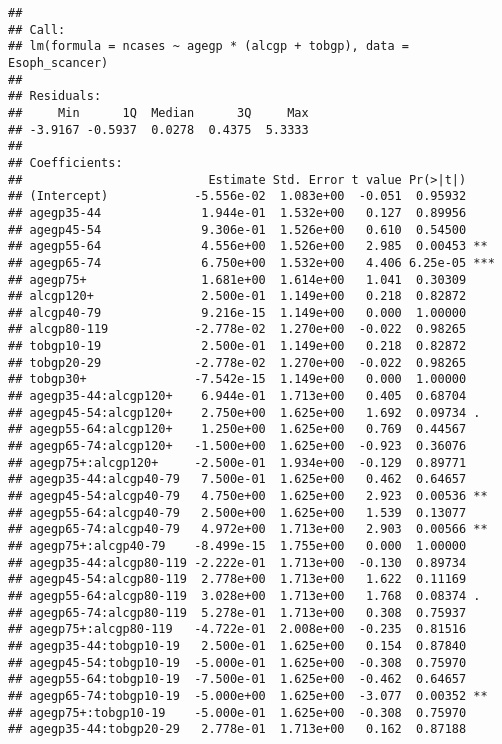 \documentclass[
]{article}
\begin{document}
\begin{verbatim}
## 
## Call:
## lm(formula = ncases ~ agegp * (alcgp + tobgp), data = Esoph_scancer)
## 
## Residuals:
##     Min      1Q  Median      3Q     Max 
## -3.9167 -0.5937  0.0278  0.4375  5.3333 
## 
## Coefficients:
##                          Estimate Std. Error t value Pr(>|t|)    
## (Intercept)            -5.556e-02  1.083e+00  -0.051  0.95932    
## agegp35-44              1.944e-01  1.532e+00   0.127  0.89956    
## agegp45-54              9.306e-01  1.526e+00   0.610  0.54500    
## agegp55-64              4.556e+00  1.526e+00   2.985  0.00453 ** 
## agegp65-74              6.750e+00  1.532e+00   4.406 6.25e-05 ***
## agegp75+                1.681e+00  1.614e+00   1.041  0.30309    
## alcgp120+               2.500e-01  1.149e+00   0.218  0.82872    
## alcgp40-79              9.216e-15  1.149e+00   0.000  1.00000    
## alcgp80-119            -2.778e-02  1.270e+00  -0.022  0.98265    
## tobgp10-19              2.500e-01  1.149e+00   0.218  0.82872    
## tobgp20-29             -2.778e-02  1.270e+00  -0.022  0.98265    
## tobgp30+               -7.542e-15  1.149e+00   0.000  1.00000    
## agegp35-44:alcgp120+    6.944e-01  1.713e+00   0.405  0.68704    
## agegp45-54:alcgp120+    2.750e+00  1.625e+00   1.692  0.09734 .  
## agegp55-64:alcgp120+    1.250e+00  1.625e+00   0.769  0.44567    
## agegp65-74:alcgp120+   -1.500e+00  1.625e+00  -0.923  0.36076    
## agegp75+:alcgp120+     -2.500e-01  1.934e+00  -0.129  0.89771    
## agegp35-44:alcgp40-79   7.500e-01  1.625e+00   0.462  0.64657    
## agegp45-54:alcgp40-79   4.750e+00  1.625e+00   2.923  0.00536 ** 
## agegp55-64:alcgp40-79   2.500e+00  1.625e+00   1.539  0.13077    
## agegp65-74:alcgp40-79   4.972e+00  1.713e+00   2.903  0.00566 ** 
## agegp75+:alcgp40-79    -8.499e-15  1.755e+00   0.000  1.00000    
## agegp35-44:alcgp80-119 -2.222e-01  1.713e+00  -0.130  0.89734    
## agegp45-54:alcgp80-119  2.778e+00  1.713e+00   1.622  0.11169    
## agegp55-64:alcgp80-119  3.028e+00  1.713e+00   1.768  0.08374 .  
## agegp65-74:alcgp80-119  5.278e-01  1.713e+00   0.308  0.75937    
## agegp75+:alcgp80-119   -4.722e-01  2.008e+00  -0.235  0.81516    
## agegp35-44:tobgp10-19   2.500e-01  1.625e+00   0.154  0.87840    
## agegp45-54:tobgp10-19  -5.000e-01  1.625e+00  -0.308  0.75970    
## agegp55-64:tobgp10-19  -7.500e-01  1.625e+00  -0.462  0.64657    
## agegp65-74:tobgp10-19  -5.000e+00  1.625e+00  -3.077  0.00352 ** 
## agegp75+:tobgp10-19    -5.000e-01  1.625e+00  -0.308  0.75970    
## agegp35-44:tobgp20-29   2.778e-01  1.713e+00   0.162  0.87188    

\end{verbatim}
\end{document}
